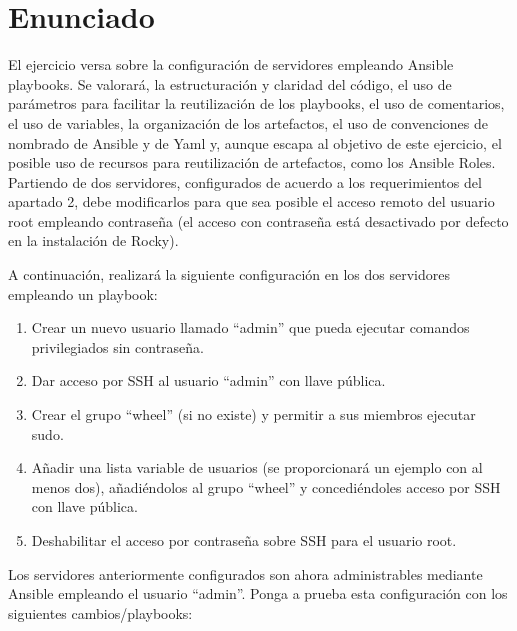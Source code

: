 \documentclass[12pt]{article}
\begin{document}
\sffamily
    \portada[%
        titulo=Ingeniería de Servidores (Prácticas),
        subtitulo=Ejercicio Ansible,
        autor=Jesús Muñoz Velasco,
        año=Curso 2024-2025]
        
    \thispagestyle{empty}
    \tableofcontents
    \newpage

    \section{Enunciado}
El ejercicio versa sobre la configuración de servidores empleando Ansible playbooks. Se valorará, la estructuración y claridad del código, el uso de parámetros para facilitar la reutilización de los playbooks, el uso de comentarios, el uso de variables, la organización de los artefactos, el uso de convenciones de nombrado de Ansible y de Yaml y, aunque escapa al objetivo de este ejercicio, el posible uso de recursos para reutilización de artefactos, como los Ansible Roles.\\

Partiendo de dos servidores, configurados de acuerdo a los requerimientos del apartado 2, debe modificarlos para que sea posible el acceso remoto del usuario root empleando contraseña (el acceso con contraseña está desactivado por defecto en la instalación de Rocky).

A continuación, realizará la siguiente configuración en los dos servidores empleando un playbook:

\begin{enumerate}
    \item Crear un nuevo usuario llamado “admin” que pueda ejecutar comandos privilegiados sin contraseña.
    \item Dar acceso por SSH al usuario “admin” con llave pública.
    \item Crear el grupo “wheel” (si no existe) y permitir a sus miembros ejecutar sudo.
    \item Añadir una lista variable de usuarios (se proporcionará un ejemplo con al menos dos), añadiéndolos al grupo “wheel” y concediéndoles acceso por SSH con llave pública.
    \item Deshabilitar el acceso por contraseña sobre SSH para el usuario root.
\end{enumerate}

Los servidores anteriormente configurados son ahora administrables mediante Ansible
empleando el usuario “admin”. Ponga a prueba esta configuración con los siguientes
cambios/playbooks:
\end{document}
